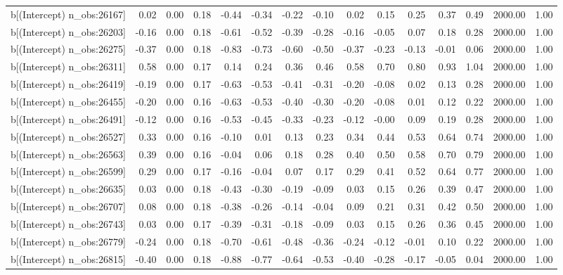 \begin{table}[ht]
\begin{tabular}{rrrrrrrrrrrrrrr}
  b[(Intercept) n\_obs:26167] & 0.02 & 0.00 & 0.18 & -0.44 & -0.34 & -0.22 & -0.10 & 0.02 & 0.15 & 0.25 & 0.37 & 0.49 & 2000.00 & 1.00 \\ 
  b[(Intercept) n\_obs:26203] & -0.16 & 0.00 & 0.18 & -0.61 & -0.52 & -0.39 & -0.28 & -0.16 & -0.05 & 0.07 & 0.18 & 0.28 & 2000.00 & 1.00 \\ 
  b[(Intercept) n\_obs:26275] & -0.37 & 0.00 & 0.18 & -0.83 & -0.73 & -0.60 & -0.50 & -0.37 & -0.23 & -0.13 & -0.01 & 0.06 & 2000.00 & 1.00 \\ 
  b[(Intercept) n\_obs:26311] & 0.58 & 0.00 & 0.17 & 0.14 & 0.24 & 0.36 & 0.46 & 0.58 & 0.70 & 0.80 & 0.93 & 1.04 & 2000.00 & 1.00 \\ 
  b[(Intercept) n\_obs:26419] & -0.19 & 0.00 & 0.17 & -0.63 & -0.53 & -0.41 & -0.31 & -0.20 & -0.08 & 0.02 & 0.13 & 0.28 & 2000.00 & 1.00 \\ 
  b[(Intercept) n\_obs:26455] & -0.20 & 0.00 & 0.16 & -0.63 & -0.53 & -0.40 & -0.30 & -0.20 & -0.08 & 0.01 & 0.12 & 0.22 & 2000.00 & 1.00 \\ 
  b[(Intercept) n\_obs:26491] & -0.12 & 0.00 & 0.16 & -0.53 & -0.45 & -0.33 & -0.23 & -0.12 & -0.00 & 0.09 & 0.19 & 0.28 & 2000.00 & 1.00 \\ 
  b[(Intercept) n\_obs:26527] & 0.33 & 0.00 & 0.16 & -0.10 & 0.01 & 0.13 & 0.23 & 0.34 & 0.44 & 0.53 & 0.64 & 0.74 & 2000.00 & 1.00 \\ 
  b[(Intercept) n\_obs:26563] & 0.39 & 0.00 & 0.16 & -0.04 & 0.06 & 0.18 & 0.28 & 0.40 & 0.50 & 0.58 & 0.70 & 0.79 & 2000.00 & 1.00 \\ 
  b[(Intercept) n\_obs:26599] & 0.29 & 0.00 & 0.17 & -0.16 & -0.04 & 0.07 & 0.17 & 0.29 & 0.41 & 0.52 & 0.64 & 0.77 & 2000.00 & 1.00 \\ 
  b[(Intercept) n\_obs:26635] & 0.03 & 0.00 & 0.18 & -0.43 & -0.30 & -0.19 & -0.09 & 0.03 & 0.15 & 0.26 & 0.39 & 0.47 & 2000.00 & 1.00 \\ 
  b[(Intercept) n\_obs:26707] & 0.08 & 0.00 & 0.18 & -0.38 & -0.26 & -0.14 & -0.04 & 0.09 & 0.21 & 0.31 & 0.42 & 0.50 & 2000.00 & 1.00 \\ 
  b[(Intercept) n\_obs:26743] & 0.03 & 0.00 & 0.17 & -0.39 & -0.31 & -0.18 & -0.09 & 0.03 & 0.15 & 0.26 & 0.36 & 0.45 & 2000.00 & 1.00 \\ 
  b[(Intercept) n\_obs:26779] & -0.24 & 0.00 & 0.18 & -0.70 & -0.61 & -0.48 & -0.36 & -0.24 & -0.12 & -0.01 & 0.10 & 0.22 & 2000.00 & 1.00 \\ 
  b[(Intercept) n\_obs:26815] & -0.40 & 0.00 & 0.18 & -0.88 & -0.77 & -0.64 & -0.53 & -0.40 & -0.28 & -0.17 & -0.05 & 0.04 & 2000.00 & 1.00 \\ 

\end{tabular}
\end{table}
